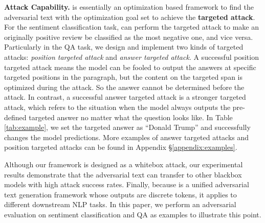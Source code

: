 \textbf{Attack Capability.} \label{two_attacks} \advcodec is essentially an optimization based framework to find the adversarial text with the optimization goal set to achieve the \textbf{targeted attack}. For the sentiment classification task, \advcodec can perform the targeted attack to make an originally positive review be classified as the most negative one, and vice versa. Particularly in the QA task, we design and implement two kinds of targeted attacks: \textit{position targeted attack} and \textit{answer targeted attack}. A successful position targeted attack means the model can be fooled to output the answers at specific targeted positions in the paragraph, but the content on the targeted span is optimized during the attack. So the answer cannot be determined before the attack. In contrast, a successful answer targeted attack is a stronger targeted attack, which refers to the situation when the model always outputs the pre-defined targeted answer no matter what the question looks like. In Table \ref{tab:example}, we set the targeted answer as ``Donald Trump'' and successfully changes the model predictions. More examples of answer targeted attacks and position targeted attacks can be found in Appendix \S\ref{appendix:examples}. 

Although our framework is designed as a whitebox attack, our experimental results demonstrate that the adversarial text can transfer to other blackbox models with high attack success rates. Finally, because \advcodec is a unified adversarial text generation framework whose outputs are discrete tokens,  it applies to different downstream NLP tasks. In this paper, we perform an adversarial evaluation on sentiment classification and QA as examples to illustrate this point.

